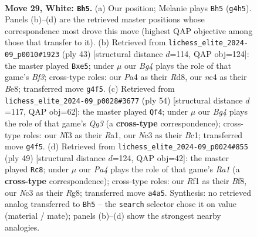 \documentclass[11pt]{article}
\begin{document}
\begin{figure}[p]
\label{fig:thought-m54}
\end{figure}

\clearpage

\begin{figure}[p]\centering
\begin{subfigure}{0.46\textwidth}\centering
\resizebox{\linewidth}{!}{%
\newchessgame
\chessboard[
  setfen={2bq2k1/rp1pr1bp/p3p3/2P2pQ1/P1nP2BP/2N2N2/1P3PK1/R1B2R2 w - - 2 29},
  showmover=false,
  pgfstyle=straightmove, color=movearrow, markmove={g4-h5}
]}
\caption{}
\end{subfigure}\hfill
\begin{subfigure}{0.46\textwidth}\centering
\resizebox{\linewidth}{!}{%
\newchessgame
\chessboard[
  setfen={1k1rb2r/ppp3pp/4qb2/2P1Bp2/1PNn4/3P3B/P4PPP/1R1QR1K1 b - - 0 22},
  showmover=false,
  pgfstyle=straightmove, color=movearrow, markmove={f6-e5}
]}
\caption{}
\end{subfigure}
\\[4pt]
\begin{subfigure}{0.46\textwidth}\centering
\resizebox{\linewidth}{!}{%
\newchessgame
\chessboard[
  setfen={r1q2r2/p4ppk/4pb1p/1Pp1Nb1P/2P1n3/P5Q1/5PP1/R1B1RBK1 w - - 3 28},
  showmover=false,
  pgfstyle=straightmove, color=movearrow, markmove={g3-f4}
]}
\caption{}
\end{subfigure}\hfill
\begin{subfigure}{0.46\textwidth}\centering
\resizebox{\linewidth}{!}{%
\newchessgame
\chessboard[
  setfen={r3kbr1/p3np2/2n1p2p/3pP3/3P1P2/q1BQN1P1/P4R1P/1R4K1 b q - 3 25},
  showmover=false,
  pgfstyle=straightmove, color=movearrow, markmove={a8-c8}
]}
\caption{}
\end{subfigure}
\caption{\textbf{Move 29, White: \texttt{Bh5}.} (a) Our position; Melanie plays \texttt{Bh5} (\texttt{g4h5}). Panels (b)--(d) are the retrieved master positions whose correspondence most drove this move (highest QAP objective among those that transfer to it). (b) Retrieved from \texttt{lichess\_elite\_2024-09\_p0010\#1923} (ply 43) [structural distance $d$=114, QAP obj=124]: the master played \texttt{Bxe5}; under $\mu$ our \emph{Bg4} plays the role of that game's \emph{Bf3}; cross-type roles: our \emph{P}a4 as their \emph{R}d8, our \emph{n}c4 as their \emph{B}e8; transferred move \texttt{g4f5}. (c) Retrieved from \texttt{lichess\_elite\_2024-09\_p0028\#3677} (ply 54) [structural distance $d$=117, QAP obj=62]: the master played \texttt{Qf4}; under $\mu$ our \emph{Bg4} plays the role of that game's \emph{Qg3} (a \textbf{cross-type} correspondence); cross-type roles: our \emph{N}f3 as their \emph{R}a1, our \emph{N}c3 as their \emph{B}c1; transferred move \texttt{g4f5}. (d) Retrieved from \texttt{lichess\_elite\_2024-09\_p0024\#855} (ply 49) [structural distance $d$=124, QAP obj=42]: the master played \texttt{Rc8}; under $\mu$ our \emph{Pa4} plays the role of that game's \emph{Ra1} (a \textbf{cross-type} correspondence); cross-type roles: our \emph{R}f1 as their \emph{B}f8, our \emph{N}c3 as their \emph{R}g8; transferred move \texttt{a4a5}. Synthesis: no retrieved analog transferred to \texttt{Bh5} -- the \texttt{search} selector chose it on value (material / mate); panels (b)--(d) show the strongest nearby analogies.}

\end{figure}
\end{document}
